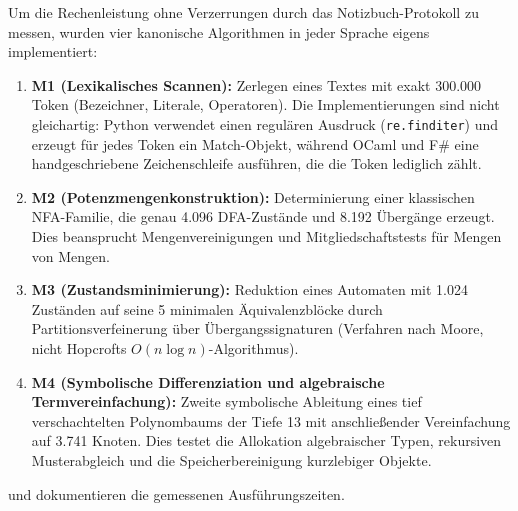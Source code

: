Um die Rechenleistung ohne Verzerrungen durch das Notizbuch-Protokoll zu messen, wurden vier kanonische Algorithmen in jeder Sprache eigens implementiert:
\begin{enumerate}
  \item \textbf{M1 (Lexikalisches Scannen):} Zerlegen eines Textes mit exakt 300.000 Token (Bezeichner, Literale, Operatoren).
  Die Implementierungen sind nicht gleichartig: Python verwendet einen regulären Ausdruck (\texttt{re.finditer}) und erzeugt für jedes Token ein Match-Objekt, während OCaml und F\# eine handgeschriebene Zeichenschleife ausführen, die die Token lediglich zählt.
  \item \textbf{M2 (Potenzmengenkonstruktion):} Determinierung einer klassischen NFA-Familie, die genau 4.096 DFA-Zustände und 8.192 Übergänge erzeugt.
  Dies beansprucht Mengenvereinigungen und Mitgliedschaftstests für Mengen von Mengen.
  \item \textbf{M3 (Zustandsminimierung):} Reduktion eines Automaten mit 1.024 Zuständen auf seine 5 minimalen Äquivalenzblöcke durch Partitionsverfeinerung über Übergangssignaturen (Verfahren nach Moore, nicht Hopcrofts $O(n \log n)$-Algorithmus).
  \item \textbf{M4 (Symbolische Differenziation und algebraische Termvereinfachung):} Zweite symbolische Ableitung eines tief verschachtelten Polynombaums der Tiefe 13 mit anschließender Vereinfachung auf 3.741 Knoten.
  Dies testet die Allokation algebraischer Typen, rekursiven Musterabgleich und die Speicherbereinigung kurzlebiger Objekte.
\end{enumerate}

 und  dokumentieren die gemessenen Ausführungszeiten.


